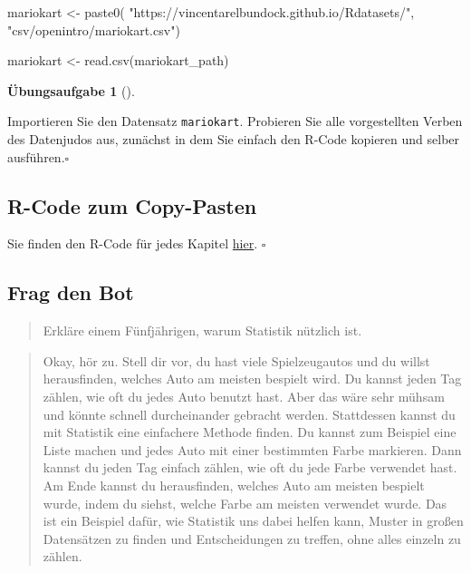 \documentclass[
  a4paper,
  DIV=11]{scrreprt}
\newenvironment{Shaded}{\begin{snugshade}}{\end{snugshade}}
\newcommand{\FunctionTok}[1]{\textcolor[rgb]{0.28,0.35,0.67}{#1}}
\newcommand{\NormalTok}[1]{\textcolor[rgb]{0.00,0.23,0.31}{#1}}
\newcommand{\OtherTok}[1]{\textcolor[rgb]{0.00,0.23,0.31}{#1}}
\newcommand{\StringTok}[1]{\textcolor[rgb]{0.13,0.47,0.30}{#1}}
\theoremstyle{definition}
\newtheorem{exercise}{Übungsaufgabe}[chapter]
\theoremstyle{definition}
\theoremstyle{definition}
\theoremstyle{remark}
\begin{document}
\begin{Shaded}
\begin{Highlighting}[]
\NormalTok{mariokart }\OtherTok{\textless{}{-}} \FunctionTok{paste0}\NormalTok{(}
  \StringTok{"https://vincentarelbundock.github.io/Rdatasets/"}\NormalTok{,}
  \StringTok{"csv/openintro/mariokart.csv"}\NormalTok{)}

\NormalTok{mariokart }\OtherTok{\textless{}{-}} \FunctionTok{read.csv}\NormalTok{(mariokart\_path)}
\end{Highlighting}
\end{Shaded}

\begin{exercise}[]\protect\hypertarget{exr-los}{}\label{exr-los}

Importieren Sie den Datensatz \texttt{mariokart}. Probieren Sie alle
vorgestellten Verben des Datenjudos aus, zunächst in dem Sie einfach den
R-Code kopieren und selber ausführen.\(\square\)

\end{exercise}

\subsection{R-Code zum Copy-Pasten}\label{r-code-zum-copy-pasten}

Sie finden den R-Code für jedes Kapitel
\href{https://github.com/sebastiansauer/statistik1/tree/main/R-code-for-all-chapters}{hier}.
\(\square\)

\subsection{Frag den Bot}\label{frag-den-bot}

\begin{quote}
{} Erkläre einem Fünfjährigen, warum Statistik nützlich
ist.
\end{quote}

\begin{quote}
{} Okay, hör zu. Stell dir vor, du hast viele
Spielzeugautos und du willst herausfinden, welches Auto am meisten
bespielt wird. Du kannst jeden Tag zählen, wie oft du jedes Auto benutzt
hast. Aber das wäre sehr mühsam und könnte schnell durcheinander
gebracht werden. Stattdessen kannst du mit Statistik eine einfachere
Methode finden. Du kannst zum Beispiel eine Liste machen und jedes Auto
mit einer bestimmten Farbe markieren. Dann kannst du jeden Tag einfach
zählen, wie oft du jede Farbe verwendet hast. Am Ende kannst du
herausfinden, welches Auto am meisten bespielt wurde, indem du siehst,
welche Farbe am meisten verwendet wurde. Das ist ein Beispiel dafür, wie
Statistik uns dabei helfen kann, Muster in großen Datensätzen zu finden
und Entscheidungen zu treffen, ohne alles einzeln zu zählen.
\end{quote}
\end{document}
